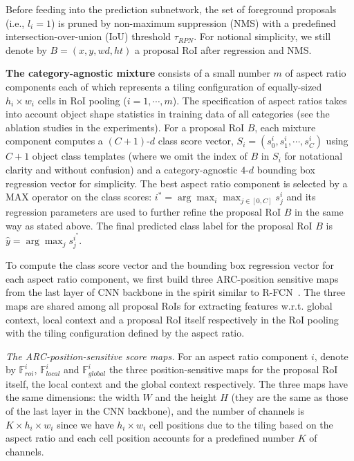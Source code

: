 \documentclass[10pt,twocolumn,letterpaper]{article}
\begin{document}
Before feeding into the prediction subnetwork, the set of foreground proposals (i.e., $l_i=1$) is pruned by non-maximum suppression (NMS) with a predefined intersection-over-union (IoU) threshold $\tau_{RPN}$.  For notional simplicity, we still denote by $B=(x, y, wd, ht)$ a proposal RoI after regression and NMS. 

\textbf{The category-agnostic mixture} consists of a small number $m$ of aspect ratio components each of which represents a tiling configuration of equally-sized $h_i\times w_i$ cells in RoI pooling ($i=1, \cdots, m$). The specification of aspect ratios takes into account object shape statistics in training data of all categories (see the ablation studies in the experiments). For a proposal RoI $B$, each mixture component computes a $(C+1)$-$d$ class score vector, $S_i=(s^i_0,s^i_1, \cdots, s^i_{C})$ using $C+1$ object class templates (where we omit the index of $B$ in $S_i$ for notational clarity and without confusion) and a category-agnostic $4$-$d$ bounding box regression vector for simplicity. The best aspect ratio component is selected by a MAX operator on the class scores: $i^*=\arg\max_i \max_{j\in[0,C]} s^i_j$ and its regression parameters are used to further refine the proposal RoI $B$ in the same way as stated above. The final predicted class label for the proposal RoI $B$ is $\hat{y}=\arg\max_j s^{i^*}_j$.

To compute the class score vector and the bounding box regression vector for each aspect ratio component, we first build three ARC-position sensitive maps from the last layer of CNN backbone in the spirit similar to R-FCN~\cite{rfcn}. The three maps are shared among all proposal RoIs for extracting features w.r.t. global context, local context and a proposal RoI itself respectively in the RoI pooling with the tiling configuration defined by the aspect ratio. 

\textit{The ARC-position-sensitive score maps.} For an aspect ratio component $i$, denote by $\mathbb{F}^i_{roi}$, $\mathbb{F}^i_{local}$ and $\mathbb{F}^i_{global}$ the three position-sensitive maps for the proposal RoI itself,  the local context and the global context respectively. The three maps have the same dimensions: the width $W$ and the height $H$ (they are the same as those of the last layer in the CNN backbone), and the number of channels is $K\times h_i\times w_i$ since we have $h_i\times w_i$ cell positions due to the tiling based on the aspect ratio and each cell position accounts for a predefined number $K$ of channels. 
\end{document}
